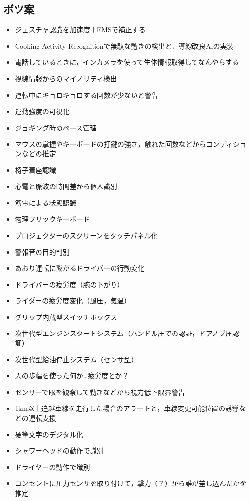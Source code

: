 \documentclass[a4j,10pt]{jarticle}
\begin{document}
\begin{multicols}{2}
  \section{ボツ案}
  \begin{itemize}
    \item ジェスチャ認識を加速度＋EMSで補正する
    \item Cooking Activity Recognitionで無駄な動きの検出と，導線改良AIの実装
    \item 電話しているときに，インカメラを使って生体情報取得してなんやらする
    \item 視線情報からのマイノリティ検出
    \item 運転中にキョロキョロする回数が少ないと警告
    \item 運動強度の可視化
    \item ジョギング時のペース管理
    \item マウスの掌握やキーボードの打鍵の強さ，触れた回数などからコンディションなどの推定
    \item 椅子着座認識
    \item 心電と脈波の時間差から個人識別
    \item 筋電による状態認識
    \item 物理フリックキーボード
    \item プロジェクターのスクリーンをタッチパネル化
    \item 警報音の目的判別
    \item あおり運転に繋がるドライバーの行動変化
    \item ドライバーの疲労度（腕の下がり）
    \item ライダーの疲労度変化（風圧，気温）
    \item グリップ内蔵型スイッチボックス
    \item 次世代型エンジンスタートシステム（ハンドル圧での認証，ドアノブ圧認証）
    \item 次世代型給油停止システム（センサ型）
    \item 人の歩幅を使った何か…疲労度とか？
    \item センサーで眼を観察して動きなどから視力低下限界警告
    \item 1km以上追越車線を走行した場合のアラートと，車線変更可能位置の誘導などの運転支援
    \item 硬筆文字のデジタル化
    \item シャワーヘッドの動作で識別
    \item ドライヤーの動作で識別
    \item コンセントに圧力センサを取り付けて，撃力（？）から誰が差し込んだかを推定
  \end{itemize}
\end{multicols}
\end{document}
